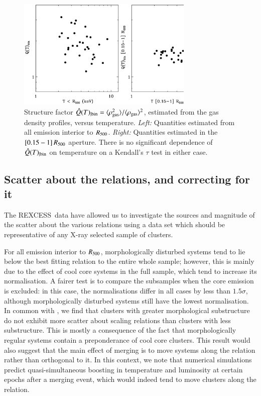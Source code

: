 \documentclass[oldversion]{aa}
\newcommand{\rexcess}{{\gwpfont REXCESS}}
\begin{document}
\begin{figure}[]
\sidecaption
\centering
\includegraphics[width=0.75\textwidth]{0944f7.ps}
\caption{{\footnotesize Structure factor $\hat{Q}(T)_{| \rm bin} = \langle \rho_{\rm gas}^2 \rangle / \langle \rho_{\rm gas}
\rangle^2$, estimated from the gas density profiles, versus temperature. {\it Left:} Quantities estimated from all emission interior to $R_{500}$. {\it Right:} Quantities estimated in the $[0.15-1]\,R_{500}$ aperture. There is no significant dependence of $\hat{Q}(T)_{| \rm bin}$ on temperature on a Kendall's $\tau$ test in either case.}}\label{fig:figQ} 
   \end{figure}



\subsection{Scatter about the relations, and correcting for it}

The \rexcess\ data have allowed us to investigate the sources and
magnitude of the scatter about the various relations using a data set
which should be representative of any X-ray selected sample of
clusters. 

For all emission interior to $R_{500}$, morphologically disturbed systems
tend to lie below the best fitting 
relation to the entire whole sample; however, this is mainly due to
the effect of cool core systems in the full sample, which tend to
increase its normalisation. A fairer test is to compare the subsamples
when the core emission is excluded: in this case, the normalisations
differ in all cases by less than $1.5\sigma$, although morphologically
disturbed systems still have the lowest normalisation.
In common with \citet{ohara06}, we find
that clusters with greater morphological substructure do not exhibit
more scatter about scaling relations than clusters with less
substructure. This is mostly a consequence of the fact that morphologically regular systems contain a preponderance of cool core clusters. This result would also suggest that the main effect of merging is to
move systems along the relation rather than orthogonal to
it. In this context, we note that numerical simulations predict
quasi-simultaneous boosting in temperature and luminosity at certain
epochs after a merging event, which would indeed tend to move clusters along
the relation. 
\end{document}
